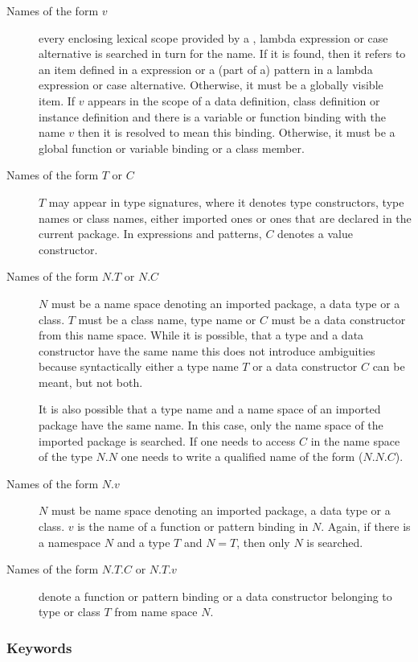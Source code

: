 \begin{description}
\item [Names of the form $v$] every enclosing lexical scope provided by a , lambda expression or case alternative is searched in turn for the name.  If it is found, then it refers to an item defined in a  expression or a (part of a) pattern in a lambda expression or case alternative. Otherwise, it must be a globally visible item. If $v$ appears in the scope of a data definition, class definition or instance definition and there is a variable or function binding with the name $v$ then it is resolved to mean this binding. Otherwise, it must be a global function or variable binding or a class member.
\item [Names of the form $T$ or $C$] $T$ may appear in type signatures, where it denotes type constructors, type names or class names, either imported ones or ones that are declared in the current package. In expressions and patterns, $C$ denotes a value constructor.
\item[Names of the form $N$.$T$ or $N$.$C$] $N$ must be a name space denoting an imported package, a data type or a class. $T$ must be a class name, type name or $C$ must be a data constructor from this name space. While it is possible, that a type and a data constructor have the same name this does not introduce ambiguities because syntactically either a type name $T$ or a data constructor $C$ can be meant, but not both.

It is also possible that a type name and a name space of an imported package have the same name. In this case, only the name space of the imported package is searched. If one needs to access $C$ in the name space of the type $N.N$ one needs to write a qualified name of the form ($N$.$N$.$C$).
\item[Names of the form $N$.$v$]
$N$ must be name space denoting an imported package, a data type or a class.
$v$ is the name of a function or pattern binding in $N$. Again, if there is a namespace $N$ and a type $T$ and $N = T$, then only $N$ is searched.
\item[Names of the form $N$.$T$.$C$ or $N$.$T$.$v$] denote a function or pattern binding or a data constructor belonging to type or class $T$ from name space $N$.
\end{description}

\subsubsection{Keywords}

